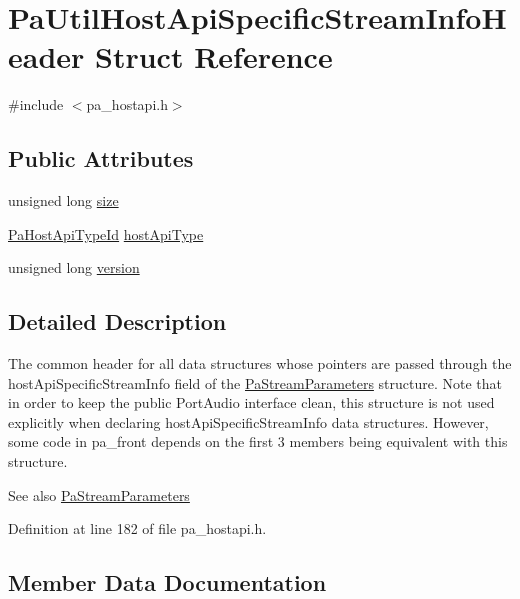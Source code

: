 \hypertarget{struct_pa_util_host_api_specific_stream_info_header}{}\section{Pa\+Util\+Host\+Api\+Specific\+Stream\+Info\+Header Struct Reference}
\label{struct_pa_util_host_api_specific_stream_info_header}


{\ttfamily \#include $<$pa\+\_\+hostapi.\+h$>$}

\subsection*{Public Attributes}
\begin{DoxyCompactItemize}
\item 
unsigned long \hyperlink{struct_pa_util_host_api_specific_stream_info_header_a5d849a7ce54b016c9c2603163bd074f5}{size}
\item 
\hyperlink{portaudio_8h_a8eaebe3d39c5ea45598da8f86dc2e5ae}{Pa\+Host\+Api\+Type\+Id} \hyperlink{struct_pa_util_host_api_specific_stream_info_header_aff56933cb47b596b6786dee809d0b29f}{host\+Api\+Type}
\item 
unsigned long \hyperlink{struct_pa_util_host_api_specific_stream_info_header_ac680579e35ad683da774a3dd1cb38174}{version}
\end{DoxyCompactItemize}


\subsection{Detailed Description}
The common header for all data structures whose pointers are passed through the host\+Api\+Specific\+Stream\+Info field of the \hyperlink{struct_pa_stream_parameters}{Pa\+Stream\+Parameters} structure. Note that in order to keep the public Port\+Audio interface clean, this structure is not used explicitly when declaring host\+Api\+Specific\+Stream\+Info data structures. However, some code in pa\+\_\+front depends on the first 3 members being equivalent with this structure. \begin{DoxySeeAlso}{See also}
\hyperlink{struct_pa_stream_parameters}{Pa\+Stream\+Parameters} 
\end{DoxySeeAlso}


Definition at line 182 of file pa\+\_\+hostapi.\+h.



\subsection{Member Data Documentation}
